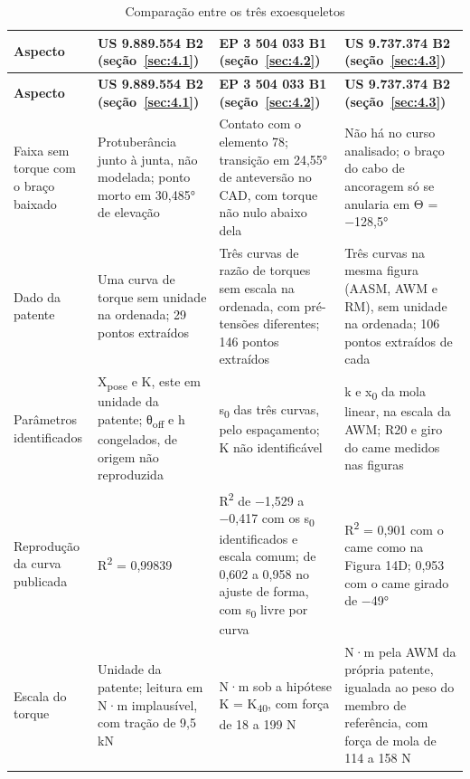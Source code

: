 \begin{tabelaabnt}{\small}
\begin{xltabular}{\textwidth}{@{}>{\hsize\raggedright\arraybackslash}X>{\hsize\raggedright\arraybackslash}X>{\hsize\raggedright\arraybackslash}X>{\hsize\raggedright\arraybackslash}X@{}}
\caption{Comparação entre os três exoesqueletos}\label{tab:comparacao-tres-exoesqueletos}\\
\toprule
\centering\textbf{Aspecto} & \centering\textbf{US 9.889.554 B2 (seção~\ref{sec:4.1})} & \centering\textbf{EP 3 504 033 B1 (seção~\ref{sec:4.2})} & \centering\textbf{US 9.737.374 B2 (seção~\ref{sec:4.3})} \tabularnewline
\midrule
\endfirsthead
\toprule
\centering\textbf{Aspecto} & \centering\textbf{US 9.889.554 B2 (seção~\ref{sec:4.1})} & \centering\textbf{EP 3 504 033 B1 (seção~\ref{sec:4.2})} & \centering\textbf{US 9.737.374 B2 (seção~\ref{sec:4.3})} \tabularnewline
\midrule
\endhead
\bottomrule
\endfoot
\bottomrule
\endlastfoot
Faixa sem torque com o braço baixado & Protuberância junto à junta, não modelada; ponto morto em 30,485° de elevação & Contato com o elemento 78; transição em 24,55° de anteversão no CAD, com torque não nulo abaixo dela & Não há no curso analisado; o braço do cabo de ancoragem só se anularia em Θ = −128,5° \\
Dado da patente & Uma curva de torque sem unidade na ordenada; 29 pontos extraídos & Três curvas de razão de torques sem escala na ordenada, com pré-tensões diferentes; 146 pontos extraídos & Três curvas na mesma figura (AASM, AWM e RM), sem unidade na ordenada; 106 pontos extraídos de cada \\
Parâmetros identificados & X\textsubscript{pose} e K, este em unidade da patente; θ\textsubscript{off} e h congelados, de origem não reproduzida & s\textsubscript{0} das três curvas, pelo espaçamento; K não identificável & k e x\textsubscript{0} da mola linear, na escala da AWM; R20 e giro do came medidos nas figuras \\
Reprodução da curva publicada & R\textsuperscript{2} = 0,99839 & R\textsuperscript{2} de −1,529 a −0,417 com os s\textsubscript{0} identificados e escala comum; de 0,602 a 0,958 no ajuste de forma, com s\textsubscript{0} livre por curva & R\textsuperscript{2} = 0,901 com o came como na Figura 14D; 0,953 com o came girado de −49° \\
Escala do torque & Unidade da patente; leitura em N·m implausível, com tração de 9,5 kN & N·m sob a hipótese K = K\textsubscript{40}, com força de 18 a 199 N & N·m pela AWM da própria patente, igualada ao peso do membro de referência, com força de mola de 114 a 158 N \\

\end{xltabular}
\end{tabelaabnt}
